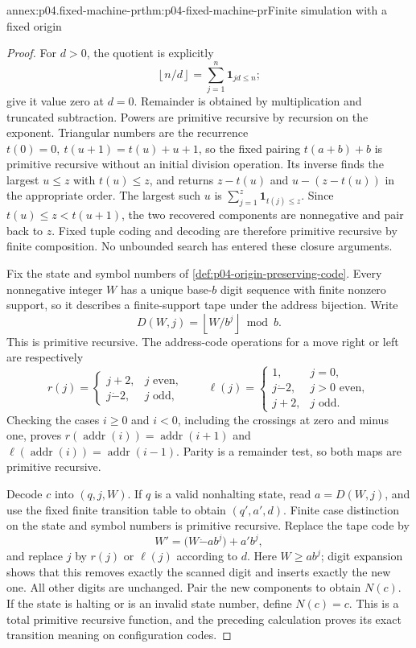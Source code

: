 \begin{annexitem}{annex:p04.fixed-machine-pr}{thm:p04-fixed-machine-pr}{Finite simulation with a fixed origin}
\begin{proof}
For \(d>0\), the quotient is explicitly
\[
 \left\lfloor n/d\right\rfloor
   =\sum_{j=1}^{n}\mathbf1_{jd\leq n};
\]
give it value zero at \(d=0\). Remainder is obtained by multiplication
and truncated subtraction. Powers are primitive recursive by recursion
on the exponent. Triangular numbers are the recurrence
\(t(0)=0,\ t(u+1)=t(u)+u+1\), so the fixed pairing
\(t(a+b)+b\) is primitive recursive without an initial division
operation. Its inverse finds the largest \(u\leq z\) with
\(t(u)\leq z\), and returns \(z-t(u)\) and
\(u-(z-t(u))\) in the appropriate order. The largest such \(u\) is
\(\sum_{j=1}^{z}\mathbf1_{t(j)\leq z}\). Since
\(t(u)\leq z<t(u+1)\), the two recovered components are nonnegative
and pair back to \(z\). Fixed tuple coding and decoding are therefore
primitive recursive by finite composition. No unbounded search has
entered these closure arguments.

Fix the state and symbol numbers of
\cref{def:p04-origin-preserving-code}. Every nonnegative integer \(W\)
has a unique base-\(b\) digit sequence with finite nonzero support, so
it describes a finite-support tape under the address bijection. Write
\[
 D(W,j)=\left\lfloor W/b^j\right\rfloor\bmod b.
\]
This is primitive recursive. The address-code operations for a move
right or left are respectively
\[
 r(j)=\begin{cases}j+2,&j\text{ even},\\
                   j\mathbin{\dot{-}}2,&j\text{ odd},\end{cases}
 \qquad
 \ell(j)=\begin{cases}1,&j=0,\\
             j\mathbin{\dot{-}}2,&j>0\text{ even},\\
             j+2,&j\text{ odd}.\end{cases}
\]
Checking the cases \(i\geq0\) and \(i<0\), including the crossings
at zero and minus one, proves
\(r(\operatorname{addr}(i))=\operatorname{addr}(i+1)\) and
\(\ell(\operatorname{addr}(i))=\operatorname{addr}(i-1)\).
Parity is a remainder test, so both maps are primitive recursive.

Decode \(c\) into \((q,j,W)\). If \(q\) is a valid nonhalting state,
read \(a=D(W,j)\), and use the fixed finite transition table to obtain
\((q',a',d)\). Finite case distinction on the state and symbol numbers
is primitive recursive. Replace the tape code by
\[
 W'=\bigl(W\mathbin{\dot{-}}a b^j\bigr)+a'b^j,
\]
and replace \(j\) by \(r(j)\) or \(\ell(j)\) according to \(d\).
Here \(W\geq ab^j\); digit expansion shows that this removes exactly
the scanned digit and inserts exactly the new one. All other digits
are unchanged. Pair the new components to obtain \(N(c)\).
If the state is halting or is an invalid state number, define \(N(c)=c\).
This is a total primitive recursive function, and the preceding
calculation proves its exact transition meaning on configuration codes.


\end{proof}
\end{annexitem}
